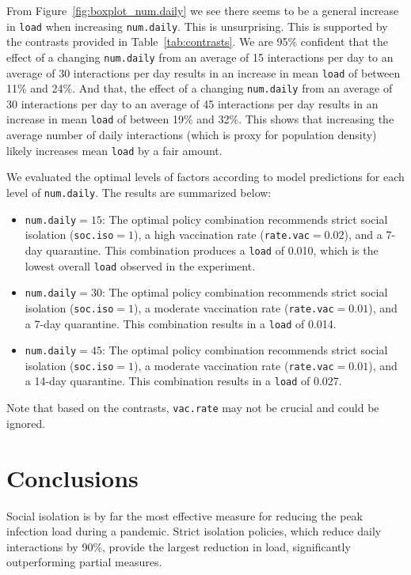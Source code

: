 \documentclass[12pt,a4paper]{article}
\begin{document}
From Figure~\ref{fig:boxplot_num.daily} we see there seems to be a general increase in \verb`load` when increasing  \verb`num.daily`. This is unsurprising. This is supported by the contrasts provided in Table~\ref{tab:contrasts}. We are 95\% confident that the effect of a changing \verb`num.daily` from an average of 15 interactions per day to an average of 30 interactions per day results in an increase in mean \verb`load` of between 11\% and 24\%. And that, the effect of a changing \verb`num.daily` from an average of 30 interactions per day to an average of 45 interactions per day results in an increase in mean \verb`load` of between 19\% and 32\%. This shows that increasing the average number of daily interactions (which is proxy for population density) likely increases mean \verb`load` by a fair amount.

We evaluated the optimal levels of factors according to model predictions for each level of \verb`num.daily`. The results are summarized below:
\begin{itemize}
	\item \verb`num.daily`$=15$: The optimal policy combination recommends strict social isolation (\verb'soc.iso'$=1$), a high vaccination rate (\verb'rate.vac'$=0.02$), and a 7-day quarantine. This combination produces a \verb`load` of 0.010, which is the lowest overall \verb`load` observed in the experiment.
	\item \verb`num.daily`$=30$: The optimal policy combination recommends strict social isolation (\verb`soc.iso`$=1$), a moderate vaccination rate (\verb`rate.vac`$= 0.01$), and a 7-day quarantine. This combination results in a \verb`load` of 0.014.
	\item \verb`num.daily`$= 45$: The optimal policy combination recommends strict social isolation (\verb`soc.iso`$= 1$), a moderate vaccination rate (\verb`rate.vac`$=0.01$), and a 14-day quarantine. This combination results in a \verb`load` of 0.027.
\end{itemize}
Note that based on the contrasts, \verb`vac.rate` may not be crucial and could be ignored.



\section{Conclusions}\label{section4}
Social isolation is by far the most effective measure for reducing the peak infection load during a pandemic. Strict isolation policies, which reduce daily interactions by 90\%, provide the largest reduction in load, significantly outperforming partial measures. 
\end{document}
